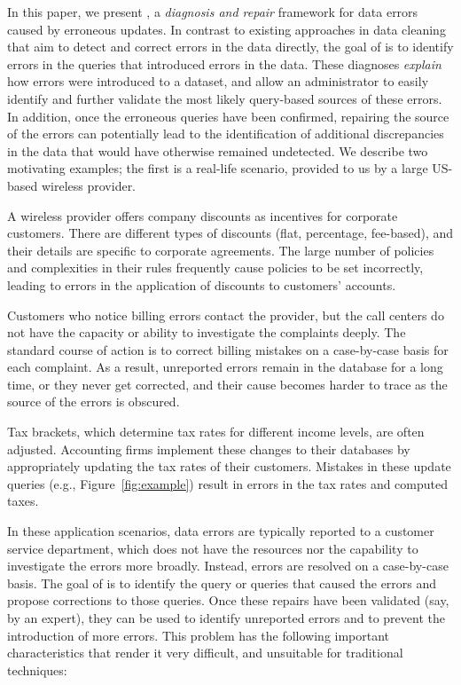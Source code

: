 In this paper, we present \sys, a \emph{diagnosis and repair} framework for data errors
caused by erroneous updates. In contrast to existing approaches in data
cleaning that aim to detect and correct errors in the data directly, the goal
of \sys is to identify errors in the queries that introduced errors in the
data. These diagnoses \emph{explain} how errors were introduced to a
dataset, and allow an administrator to easily identify and further validate the most likely query-based sources of these errors. 
In addition, once the erroneous queries have been confirmed, repairing the source of the errors
can potentially lead to the identification of additional discrepancies in
the data that would have otherwise remained undetected.  
We describe two motivating examples; the first is a real-life scenario, provided to us by a large US-based wireless provider.
% 
\begin{example}\label{ex:telco}

A wireless provider offers company discounts as incentives for
corporate customers. There are different types of discounts (flat, percentage,
fee-based), and their details are specific to corporate agreements. The large
number of policies and complexities in their rules frequently cause policies
to be set incorrectly, leading to errors in the application of discounts to
customers' accounts.

Customers who notice billing errors contact the provider, but the call centers
do not have the capacity or ability to investigate the complaints deeply. The
standard course of action is to correct billing mistakes on a case-by-case
basis for each complaint. As a result, unreported errors remain in the
database for a long time, or they never get corrected, and their cause becomes
harder to trace as the source of the errors is obscured.

\end{example}
% 
\begin{example}\label{ex:taxes}
    
Tax brackets, which determine tax rates for different income levels, are
often adjusted. Accounting firms implement these changes to their
databases by appropriately updating the tax rates of their customers. Mistakes
in these update queries (e.g., Figure~\ref{fig:example}) result in errors in
the tax rates and computed taxes. 

\end{example}
% 
In these application scenarios, data errors are typically reported to
a customer service department, which does not have the resources nor
the capability to investigate the errors more broadly. Instead, errors
are resolved on a case-by-case basis. The goal of \sys is to identify
the query or queries that caused the errors and propose corrections to
those queries.  Once these repairs have been validated (say, by an expert), they can be used to identify unreported
errors and to prevent the introduction of more errors. This problem
has the following important characteristics that render it very difficult, and unsuitable for traditional
techniques:


